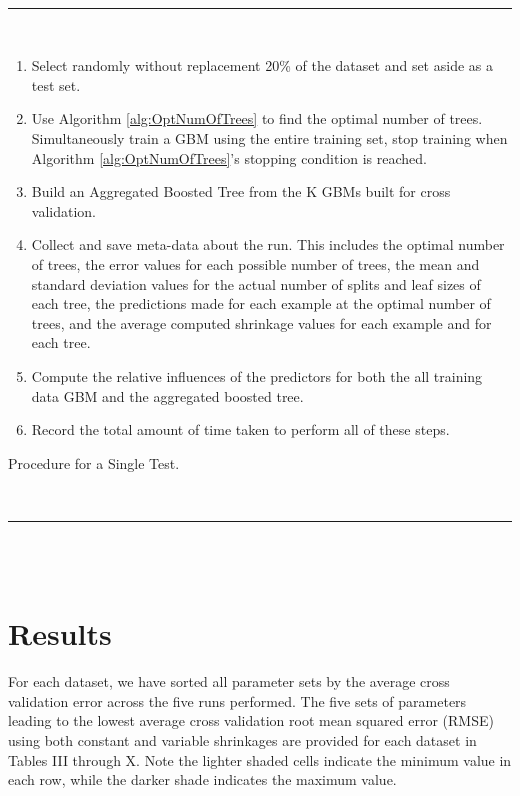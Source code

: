 \documentclass[9pt, conference]{IEEEtran}
\begin{document}
\begin{algorithm}[]
	\hspace{1 mm} \\\hrule\hspace{1 mm} \\
	\begin{enumerate}
		\item Select randomly without replacement 20\% of the dataset and set aside as a test set.
		\item Use Algorithm \ref{alg:OptNumOfTrees} to find the optimal number of trees. Simultaneously train a GBM using the entire training set, stop training when Algorithm \ref{alg:OptNumOfTrees}'s stopping condition is reached.
		\item Build an Aggregated Boosted Tree from the K GBMs built for cross validation.
		\item Collect and save meta-data about the run. This includes the optimal number of trees, the error values for each possible number of trees, the mean and standard deviation values for the actual number of splits and leaf sizes of each tree, the predictions made for each example at the optimal number of trees, and the average computed shrinkage values for each example and for each tree.
		\item Compute the relative influences of the predictors for both the all training data GBM and the aggregated boosted tree.
		\item Record the total amount of time taken to perform all of these steps.
	\end{enumerate}
	\caption{Procedure for a Single Test.}
	\hspace{1 mm} \\\hrule\hspace{1 mm} \\\hspace{1 mm} \\
	\label{alg:tuningProcedure}
\end{algorithm}

\begin{figure}[!t]

\end{figure}
\section{Results}

For each dataset, we have sorted all parameter sets by the average cross validation error across the five runs performed. The five sets of parameters leading to the lowest average cross validation root mean squared error (RMSE) using both constant and variable shrinkages are provided for each dataset in Tables III through X. Note the lighter shaded cells indicate the minimum value in each row, while the darker shade indicates the maximum value.
\end{document}
